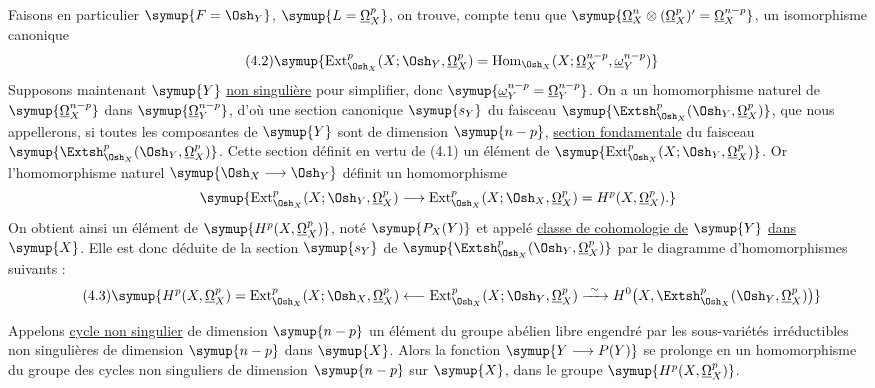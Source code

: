 Faisons en particulier $\symup{F=\Osh_Y}$, $\symup{L=\underline{\Omega}_X^{p}}$, on trouve, compte tenu
que $\symup{\underline{\Omega}_X^{n}\otimes(\underline{\Omega}_X^{p})'=\underline{\Omega}_X^{n-p}}$, un isomorphisme
canonique
\begin{equation}\tag{4.2}
  \symup{\operatorname{Ext}_{\Osh_X}^{p}(X;\Osh_Y,\underline{\Omega}_X^{p})
  =\operatorname{Hom}_{\Osh_X}
  (X;\underline{\Omega}_X^{n-p},\underline{\omega}_Y^{n-p})}
\end{equation}
Supposons maintenant $\symup{Y}$ \uline{non singulière} pour simplifier, donc
$\symup{\underline{\omega}_Y^{n-p}=\underline{\Omega}_Y^{n-p}}$. On a un homomorphisme naturel de
$\symup{\underline{\Omega}_X^{n-p}}$ dans $\symup{\underline{\Omega}_Y^{n-p}}$, d'où une section canonique $\symup{s_Y}$ du
faisceau $\symup{\Extsh_{\Osh_X}^{p}(\Osh_Y,\underline{\Omega}_X^{p})}$, que nous appellerons, si
toutes les composantes de $\symup{Y}$ sont de dimension $\symup{n-p}$, \uline{section
fondamentale} du faisceau $\symup{\Extsh_{\Osh_X}^{p}(\Osh_Y,\underline{\Omega}_X^{p})}$. Cette
section définit en vertu de (4.1) un élément de
$\symup{\operatorname{Ext}_{\Osh_X}^{p}(X;\Osh_Y,\underline{\Omega}_X^{p})}$. Or l'homomorphisme
naturel $\symup{\Osh_X\longrightarrow\Osh_Y}$ définit un homomorphisme
\[
  \symup{\operatorname{Ext}_{\Osh_X}^{p}(X;\Osh_Y,\underline{\Omega}_X^{p})
  \longrightarrow
  \operatorname{Ext}_{\Osh_X}^{p}(X;\Osh_X,\underline{\Omega}_X^{p})
  =H^{p}(X,\underline{\Omega}_X^{p}).}
\]
On obtient ainsi un élément de $\symup{H^{p}(X,\underline{\Omega}_X^{p})}$, noté $\symup{P_X(Y)}$ et appelé
\uline{classe de cohomologie de} $\symup{Y}$ \uline{dans} $\symup{X}$. Elle est donc déduite de la section
$\symup{s_Y}$ de $\symup{\Extsh_{\Osh_X}^{p}(\Osh_Y,\underline{\Omega}_X^{p})}$ par le diagramme
d'homomorphismes suivants :
\begin{equation}\tag{4.3}

\symup{H^{p}(X,\underline{\Omega}_X^{p})
=\operatorname{Ext}_{\Osh_X}^{p}(X;\Osh_X,\underline{\Omega}_X^{p})
\longleftarrow\operatorname{Ext}_{\Osh_X}^{p}(X;\Osh_Y,\underline{\Omega}_X^{p})
\xrightarrow{\ \sim\ }
H^{0}\!\left(X,\Extsh_{\Osh_X}^{p}(\Osh_Y,\underline{\Omega}_X^{p})\right)}
\end{equation}

Appelons \uline{cycle non singulier} de dimension $\symup{n-p}$ un élément du groupe
abélien libre engendré par les sous-variétés irréductibles non singulières de
dimension $\symup{n-p}$ dans $\symup{X}$. Alors la fonction $\symup{Y\longrightarrow P(Y)}$ se prolonge en
un homomorphisme du groupe des cycles non singuliers de dimension $\symup{n-p}$ sur $\symup{X}$,
dans le groupe $\symup{H^{p}(X,\underline{\Omega}_X^{p})}$.

